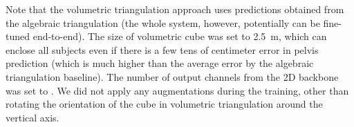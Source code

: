 \documentclass[10pt,twocolumn,letterpaper]{article}
\begin{document}
Note that the volumetric triangulation approach uses predictions obtained from the algebraic triangulation (the whole system, however, potentially can be fine-tuned end-to-end). The size of volumetric cube  was set to 2.5~m, which can enclose all subjects even if there is a few tens of centimeter error in pelvis prediction (which is much higher than the average error by the algebraic triangulation baseline). The number of output channels from the 2D backbone was set to .  We did not apply any augmentations during the training, other than rotating the orientation of the cube in volumetric triangulation around the vertical axis.


\begin{table*}
\end{table*}
\end{document}
